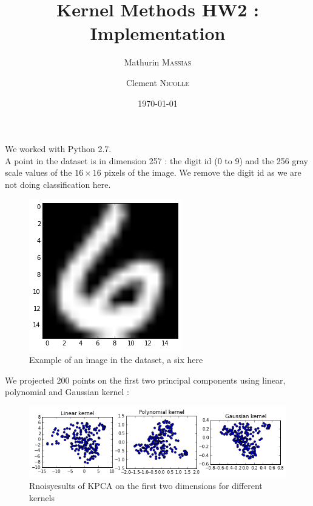 \documentclass[11pt,a4paper]{article}
\begin{document}
\title{Kernel Methods HW2 : Implementation}
\author{Mathurin \textsc{Massias} \and Clement \textsc{Nicolle}}
\date{\today} 

\maketitle

\hspace{-6mm}

We worked with Python 2.7.
\\A point in the dataset is in dimension 257 : the digit id (0 to 9) and the 256 gray scale values of the $16 \times 16$ pixels of the image. We remove the digit id as we are not doing classification here.

\begin{figure}[H]
	\centering
	\noindent\includegraphics[scale=0.4]{six.png}
	\caption{Example of an image in the dataset, a six here}
\end{figure}

We projected 200 points on the first two principal components using linear, polynomial and Gaussian kernel :
\begin{figure}[H]
	\centering
	\noindent\includegraphics[scale=0.7]{kpca.png}
	\caption{Rnoisyesults of KPCA on the first two dimensions for different kernels}
\end{figure}
\end{document}
